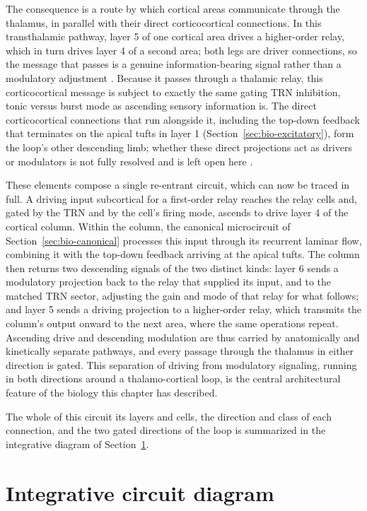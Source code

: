 The consequence is a route by which cortical areas communicate through the thalamus, in parallel with their direct corticocortical connections. In this transthalamic pathway, layer 5 of one cortical area drives a higher-order relay, which in turn drives layer 4 of a second area; both legs are driver connections, so the message that passes is a genuine information-bearing signal rather than a modulatory adjustment \parencite{sherman2011, sherman2013}. Because it passes through a thalamic relay, this corticocortical message is subject to exactly the same gating  TRN inhibition, tonic versus burst mode  as ascending sensory information is. The direct corticocortical connections that run alongside it, including the top-down feedback that terminates on the apical tufts in layer 1 (Section~\ref{sec:bio-excitatory}), form the loop's other descending limb; whether these direct projections act as drivers or modulators is not fully resolved and is left open here \parencite{sherman1998}.

These elements compose a single re-entrant circuit, which can now be traced in full. A driving input  subcortical for a first-order relay  reaches the relay cells and, gated by the TRN and by the cell's firing mode, ascends to drive layer 4 of the cortical column. Within the column, the canonical microcircuit of Section~\ref{sec:bio-canonical} processes this input through its recurrent laminar flow, combining it with the top-down feedback arriving at the apical tufts. The column then returns two descending signals of the two distinct kinds: layer 6 sends a modulatory projection back to the relay that supplied its input, and to the matched TRN sector, adjusting the gain and mode of that relay for what follows; and layer 5 sends a driving projection to a higher-order relay, which transmits the column's output onward to the next area, where the same operations repeat. Ascending drive and descending modulation are thus carried by anatomically and kinetically separate pathways, and every passage through the thalamus  in either direction  is gated. This separation of driving from modulatory signaling, running in both directions around a thalamo-cortical loop, is the central architectural feature of the biology this chapter has described.

The whole of this circuit  its layers and cells, the direction and class of each connection, and the two gated directions of the loop  is summarized in the integrative diagram of Section~\ref{sec:bio-diagram}.

\section{Integrative circuit diagram}
\label{sec:bio-diagram}

